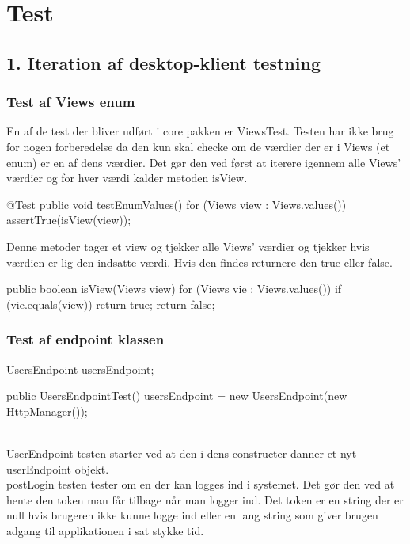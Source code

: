 \section{Test}
\subsection{1. Iteration af desktop-klient testning}
\subsubsection{Test af Views enum}
En af de test der bliver udført i core pakken er ViewsTest. Testen har ikke brug for nogen forberedelse da den kun skal checke om de værdier der er i Views (et enum) er en af dens værdier. Det gør den ved først at iterere igennem alle Views' værdier og for hver værdi kalder metoden isView.\\

\begin{code}[caption=ViewsTest.jar, firstnumber=10]
@Test
public void testEnumValues() {
    for (Views view : Views.values()) {
        assertTrue(isView(view));
    }
}
\end{code}

Denne metoder tager et view og tjekker alle Views' værdier og tjekker hvis værdien er lig den indsatte værdi. Hvis den findes returnere den true eller false.

\begin{code}[caption=ViewsTest.jar, firstnumber=17]
public boolean isView(Views view) {
    for (Views vie : Views.values()) {
        if (vie.equals(view)) {
            return true;
        }
    }
    return false;
}
\end{code}

\subsubsection{Test af endpoint klassen}
\begin{code}[caption=UsersEndpointTest.jar, firstnumber=8]
UsersEndpoint usersEndpoint;

public UsersEndpointTest() {
    usersEndpoint = new UsersEndpoint(new HttpManager());
}
\end{code}\\

UserEndpoint testen starter ved at den i dens constructer danner et nyt userEndpoint objekt. \\
postLogin testen tester om en der kan logges ind i systemet. Det gør den ved at hente den token man får tilbage når man logger ind. Det token er en string der er null hvis brugeren ikke kunne logge ind eller en lang string som giver brugen adgang til applikationen i sat stykke tid. \\
    

